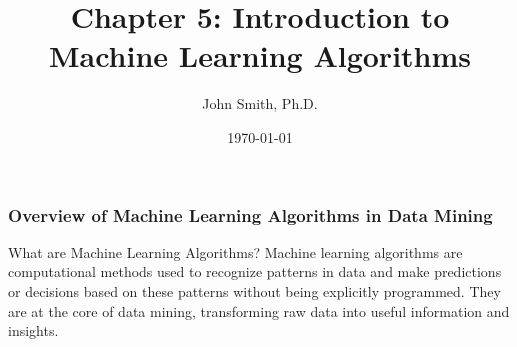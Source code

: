 \documentclass[aspectratio=169]{beamer}
\title{Chapter 5: Introduction to Machine Learning Algorithms}
\author{John Smith, Ph.D.}
\date{\today}
\begin{document}
\frame{\titlepage}

\begin{frame}[fragile]
    \titlepage
\end{frame}

\begin{frame}[fragile]
    \frametitle{Overview of Machine Learning Algorithms in Data Mining}
    \begin{block}{What are Machine Learning Algorithms?}
        Machine learning algorithms are computational methods used to recognize patterns in data and make predictions or decisions based on these patterns without being explicitly programmed. They are at the core of data mining, transforming raw data into useful information and insights.
    \end{block}
\end{frame}
\end{document}
